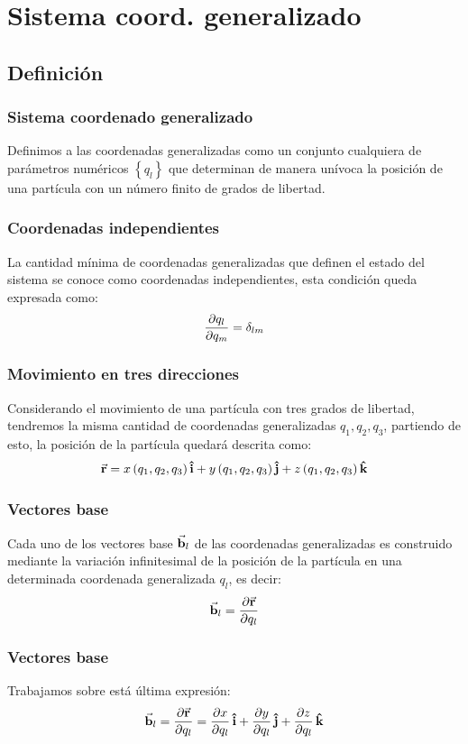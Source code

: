 \documentclass[12pt]{beamer}
\begin{document}
\section{Sistema coord. generalizado}
\subsection{Definición}

\begin{frame}
\frametitle{Sistema coordenado generalizado}
Definimos a las coordenadas generalizadas como un conjunto cualquiera de parámetros numéricos $\left\{ q_{l} \right\}$ que determinan de manera unívoca la posición de una partícula con un número finito de grados de libertad.
\end{frame}
\begin{frame}
\frametitle{Coordenadas independientes}
La cantidad mínima de coordenadas generalizadas que definen el estado del sistema se conoce como coordenadas independientes, esta condición queda expresada como:
\pause
\begin{align*}
\pdv{q_{l}}{q_{m}} = \delta_{l m}
\end{align*}
\end{frame}
\begin{frame}
\frametitle{Movimiento en tres direcciones}
Considerando el movimiento de una partícula con tres grados de libertad, tendremos la misma cantidad de coordenadas generalizadas $q_{1}, q_{2}, q_{3}$, partiendo de esto, la posición de la partícula quedará descrita como:
\pause
\begin{align}
\va{r} = x \, (q_{1}, q_{2}, q_{3}) \, \vu{i} + y \, (q_{1}, q_{2}, q_{3}) \, \vu{j} + z \, (q_{1}, q_{2}, q_{3}) \, \vu{k}
\label{eq:ecuacion_01_01}
\end{align}
\end{frame}
\begin{frame}
\frametitle{Vectores base}
Cada uno de los vectores base $\va{b}_{l}$ de las coordenadas generalizadas es construido mediante la variación infinitesimal de la posición de la partícula en una determinada coordenada generalizada $q_{{l}}$, es decir:
\pause
\begin{align*}
\va{b}_{l} = \pdv{\va{r}}{q_{l}}
\end{align*}
\end{frame}
\begin{frame}
\frametitle{Vectores base}
Trabajamos sobre está última expresión:
\pause
\begin{align}
\va{b}_{l} = \pdv{\va{r}}{q_{l}} = \pdv{x}{q_{l}} \, \vu{i} + \pdv{y}{q_{l}} \, \vu{j} + \pdv{z}{q_{l}} \, \vu{k}
\label{eq:ecuacion_01_02}
\end{align}
\end{frame}
\end{document}
